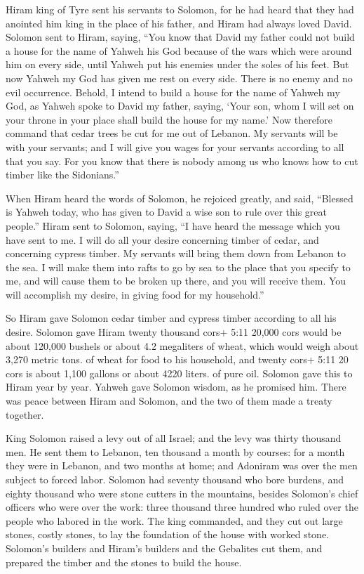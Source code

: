  Hiram king of Tyre sent his servants to Solomon, for he had
heard that they had anointed him king in the place of his father, and
Hiram had always loved David.  Solomon sent to Hiram,
saying,  ``You know that David my father could not build a
house for the name of Yahweh his God because of the wars which were
around him on every side, until Yahweh put his enemies under the soles
of his feet.  But now Yahweh my God has given me rest on
every side. There is no enemy and no evil occurrence. 
Behold, I intend to build a house for the name of Yahweh my God, as
Yahweh spoke to David my father, saying, `Your son, whom I will set on
your throne in your place shall build the house for my name.'
 Now therefore command that cedar trees be cut for me out of
Lebanon. My servants will be with your servants; and I will give you
wages for your servants according to all that you say. For you know that
there is nobody among us who knows how to cut timber like the
Sidonians.''

 When Hiram heard the words of Solomon, he rejoiced greatly,
and said, ``Blessed is Yahweh today, who has given to David a wise son
to rule over this great people.''  Hiram sent to Solomon,
saying, ``I have heard the message which you have sent to me. I will do
all your desire concerning timber of cedar, and concerning cypress
timber.  My servants will bring them down from Lebanon to
the sea. I will make them into rafts to go by sea to the place that you
specify to me, and will cause them to be broken up there, and you will
receive them. You will accomplish my desire, in giving food for my
household.''

 So Hiram gave Solomon cedar timber and cypress timber
according to all his desire.  Solomon gave Hiram twenty
thousand cors+ 5:11 20,000 cors would be about 120,000 bushels or about
4.2 megaliters of wheat, which would weigh about 3,270 metric tons. of
wheat for food to his household, and twenty cors+ 5:11 20 cors is about
1,100 gallons or about 4220 liters. of pure oil. Solomon gave this to
Hiram year by year.  Yahweh gave Solomon wisdom, as he
promised him. There was peace between Hiram and Solomon, and the two of
them made a treaty together.

 King Solomon raised a levy out of all Israel; and the levy
was thirty thousand men.  He sent them to Lebanon, ten
thousand a month by courses: for a month they were in Lebanon, and two
months at home; and Adoniram was over the men subject to forced labor.
 Solomon had seventy thousand who bore burdens, and eighty
thousand who were stone cutters in the mountains,  besides
Solomon's chief officers who were over the work: three thousand three
hundred who ruled over the people who labored in the work. 
The king commanded, and they cut out large stones, costly stones, to lay
the foundation of the house with worked stone.  Solomon's
builders and Hiram's builders and the Gebalites cut them, and prepared
the timber and the stones to build the house.


